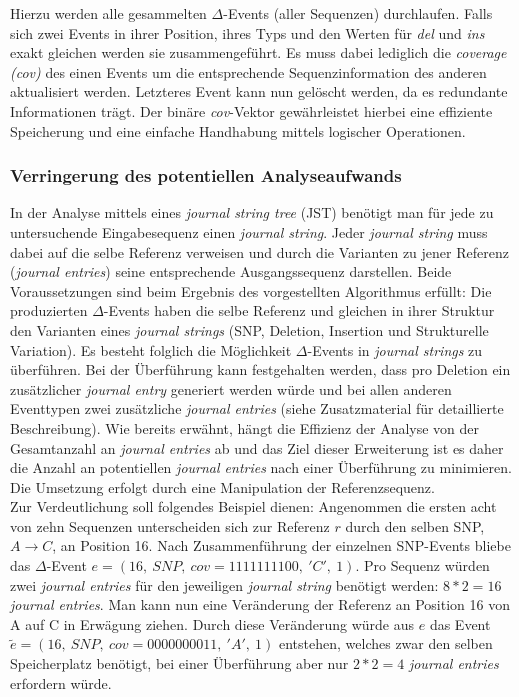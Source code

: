 \documentclass[12pt]{article}
\begin{document}
Hierzu werden alle gesammelten $\Delta$-Events (aller Sequenzen) durchlaufen. Falls sich zwei Events in ihrer Position, ihres Typs und den Werten für \textit{del} und \textit{ins} exakt gleichen werden sie zusammengeführt. Es muss dabei lediglich die \textit{coverage (cov)} des einen Events um die entsprechende Sequenzinformation des anderen aktualisiert werden. Letzteres Event kann nun gelöscht werden, da es redundante Informationen trägt. Der binäre \textit{cov}-Vektor gewährleistet hierbei eine effiziente Speicherung und eine einfache Handhabung mittels logischer Operationen.

\subsubsection{Verringerung des potentiellen Analyseaufwands}
In der Analyse mittels eines \textit{journal string tree} (JST) benötigt man für jede zu untersuchende Eingabesequenz einen \textit{journal string}. Jeder \textit{journal string} muss dabei auf die selbe Referenz verweisen und durch die Varianten zu jener Referenz (\textit{journal entries}) seine entsprechende Ausgangssequenz darstellen. Beide Voraussetzungen sind beim Ergebnis des vorgestellten Algorithmus erfüllt: Die produzierten $\Delta$-Events haben die selbe Referenz und gleichen in ihrer Struktur den Varianten eines \textit{journal strings} (SNP, Deletion, Insertion und Strukturelle Variation). Es besteht folglich die Möglichkeit $\Delta$-Events in \textit{journal strings} zu überführen.
Bei der Überführung kann festgehalten werden, dass pro Deletion ein zusätzlicher \textit{journal entry} generiert werden würde und bei allen anderen Eventtypen zwei zusätzliche \textit{journal entries} (siehe Zusatzmaterial für detaillierte Beschreibung).
Wie bereits erwähnt, hängt die Effizienz der Analyse von der Gesamtanzahl an \textit{journal entries} ab und das Ziel dieser Erweiterung ist es daher die Anzahl an potentiellen \textit{journal entries} nach einer Überführung zu minimieren. Die Umsetzung erfolgt durch eine Manipulation der Referenzsequenz.\\

Zur Verdeutlichung soll folgendes Beispiel dienen: Angenommen die ersten acht von zehn Sequenzen unterscheiden sich zur Referenz $r$ durch den selben SNP, $A\rightarrow C$, an Position 16. Nach Zusammenführung der einzelnen SNP-Events bliebe das $\Delta$-Event $e = (16,~SNP,~cov=1111111100,~'C',~1)$. Pro Sequenz würden zwei \textit{journal entries} für den jeweiligen \textit{journal string} benötigt werden: $8*2 = 16$ \textit{journal entries}. Man kann nun eine Veränderung der Referenz an Position 16 von A auf C in Erwägung ziehen. Durch diese Veränderung würde aus $e$ das Event $\tilde{e} = (16,~SNP,~cov=0000000011,~'A',~1)$ entstehen, welches zwar den selben Speicherplatz benötigt, bei einer Überführung aber nur $2*2=4$ \textit{journal entries} erfordern würde.
\\
\end{document}
